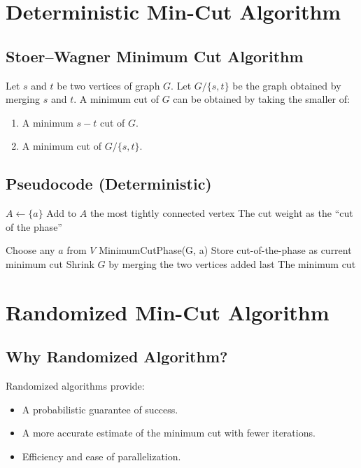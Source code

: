 \documentclass[11pt]{article}
\begin{document}
\section{Deterministic Min-Cut Algorithm}
\subsection{Stoer--Wagner Minimum Cut Algorithm}
Let $s$ and $t$ be two vertices of graph $G$. Let $G/\{s, t\}$ be the graph obtained by merging $s$ and $t$.
A minimum cut of $G$ can be obtained by taking the smaller of:
\begin{enumerate}
    \item A minimum $s-t$ cut of $G$.
    \item A minimum cut of $G/\{s, t\}$.
\end{enumerate}

\subsection{Pseudocode (Deterministic)}
\begin{algorithm}
\caption{MinimumCutPhase(G, a)}
\begin{algorithmic}
\State $A \leftarrow \{a\}$
    \State Add to $A$ the most tightly connected vertex
\EndWhile
\State \Return The cut weight as the ``cut of the phase''
\end{algorithmic}
\end{algorithm}

\begin{algorithm}
\caption{MinimumCut(G)}
\begin{algorithmic}
    \State Choose any $a$ from $V$
    \State MinimumCutPhase(G, a)
        \State Store cut-of-the-phase as current minimum cut
    \EndIf
    \State Shrink $G$ by merging the two vertices added last
\EndWhile
\State \Return The minimum cut
\end{algorithmic}
\end{algorithm}

\section{Randomized Min-Cut Algorithm}
\subsection{Why Randomized Algorithm?}
Randomized algorithms provide:
\begin{itemize}
    \item A probabilistic guarantee of success.
    \item A more accurate estimate of the minimum cut with fewer iterations.
    \item Efficiency and ease of parallelization.
\end{itemize}
\end{document}
